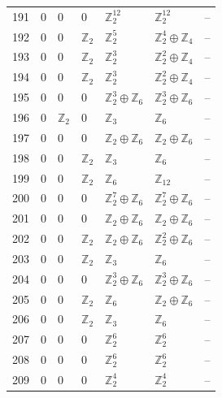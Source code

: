 \documentclass[10pt]{article}
\begin{document}
\begin{longtable}{rlllllr}
191 & $0$ & $0$ & $0$ & $\mathbb{Z}_{2}^{12}$ & $\mathbb{Z}_{2}^{12}$ & -- \\
192 & $0$ & $0$ & $\mathbb{Z}_{2}$ & $\mathbb{Z}_{2}^{5}$ & $\mathbb{Z}_{2}^{4}\oplus \mathbb{Z}_{4}$ & -- \\
193 & $0$ & $0$ & $\mathbb{Z}_{2}$ & $\mathbb{Z}_{2}^{3}$ & $\mathbb{Z}_{2}^{2}\oplus \mathbb{Z}_{4}$ & -- \\
194 & $0$ & $0$ & $\mathbb{Z}_{2}$ & $\mathbb{Z}_{2}^{3}$ & $\mathbb{Z}_{2}^{2}\oplus \mathbb{Z}_{4}$ & -- \\
195 & $0$ & $0$ & $0$ & $\mathbb{Z}_{2}^{3}\oplus \mathbb{Z}_{6}$ & $\mathbb{Z}_{2}^{3}\oplus \mathbb{Z}_{6}$ & -- \\
196 & $0$ & $\mathbb{Z}_{2}$ & $0$ & $\mathbb{Z}_{3}$ & $\mathbb{Z}_{6}$ & -- \\
197 & $0$ & $0$ & $0$ & $\mathbb{Z}_{2}\oplus \mathbb{Z}_{6}$ & $\mathbb{Z}_{2}\oplus \mathbb{Z}_{6}$ & -- \\
198 & $0$ & $0$ & $\mathbb{Z}_{2}$ & $\mathbb{Z}_{3}$ & $\mathbb{Z}_{6}$ & -- \\
199 & $0$ & $0$ & $\mathbb{Z}_{2}$ & $\mathbb{Z}_{6}$ & $\mathbb{Z}_{12}$ & -- \\
200 & $0$ & $0$ & $0$ & $\mathbb{Z}_{2}^{7}\oplus \mathbb{Z}_{6}$ & $\mathbb{Z}_{2}^{7}\oplus \mathbb{Z}_{6}$ & -- \\
201 & $0$ & $0$ & $0$ & $\mathbb{Z}_{2}\oplus \mathbb{Z}_{6}$ & $\mathbb{Z}_{2}\oplus \mathbb{Z}_{6}$ & -- \\
202 & $0$ & $0$ & $\mathbb{Z}_{2}$ & $\mathbb{Z}_{2}\oplus \mathbb{Z}_{6}$ & $\mathbb{Z}_{2}^{2}\oplus \mathbb{Z}_{6}$ & -- \\
203 & $0$ & $0$ & $\mathbb{Z}_{2}$ & $\mathbb{Z}_{3}$ & $\mathbb{Z}_{6}$ & -- \\
204 & $0$ & $0$ & $0$ & $\mathbb{Z}_{2}^{3}\oplus \mathbb{Z}_{6}$ & $\mathbb{Z}_{2}^{3}\oplus \mathbb{Z}_{6}$ & -- \\
205 & $0$ & $0$ & $\mathbb{Z}_{2}$ & $\mathbb{Z}_{6}$ & $\mathbb{Z}_{2}\oplus \mathbb{Z}_{6}$ & -- \\
206 & $0$ & $0$ & $\mathbb{Z}_{2}$ & $\mathbb{Z}_{3}$ & $\mathbb{Z}_{6}$ & -- \\
207 & $0$ & $0$ & $0$ & $\mathbb{Z}_{2}^{6}$ & $\mathbb{Z}_{2}^{6}$ & -- \\
208 & $0$ & $0$ & $0$ & $\mathbb{Z}_{2}^{6}$ & $\mathbb{Z}_{2}^{6}$ & -- \\
209 & $0$ & $0$ & $0$ & $\mathbb{Z}_{2}^{4}$ & $\mathbb{Z}_{2}^{4}$ & -- \\

\end{longtable}
\end{document}
